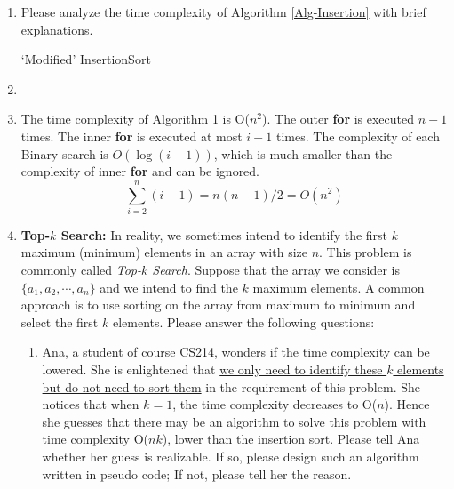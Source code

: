 \documentclass[12pt,a4paper]{article}
\makeatletter
\newtheorem*{solution}{Solution}
\theoremstyle{definition}
\renewenvironment{solution}[1][Solution] {\par\pushQED{\qed}\normalfont\topsep6\p@\@plus6\p@\relax\trivlist\item[\hskip\labelsep\bfseries#1\@addpunct{.}]\ignorespaces}{\popQED\endtrivlist\@endpefalse} \makeatother
\makeatother
\begin{document}
\begin{enumerate}
\begin{enumerate}
\begin{proof}
    So the assumption $p_{k+1}\geq2^{2^{k+1}}$ fails. Thus, $p_{k+1}<2^{2^{k+1}}$. $P(k+1)$ is true.

    Together, $p_n<2^{2^n} (n \in \mathbb{N})$.
    \end{proof}
\end{enumerate}

\item Please analyze the time complexity of Algorithm \ref{Alg-Insertion} with brief explanations.

\begin{minipage}[t]{0.94\textwidth}
\begin{algorithm}[H]
\BlankLine
\caption{`Modified' InsertionSort}
\label{Alg-Insertion}
\end{algorithm}
\end{minipage}\newpage

\begin{solution}
\item The time complexity of Algorithm 1 is O($n^2$).
    The outer \textbf{for} is executed $n-1$ times. The inner \textbf{for} is executed at most $i-1$ times. The complexity of each Binary search is $O(\log (i-1))$, which is much smaller than the complexity of inner \textbf{for} and can be ignored.
    $$\sum\limits_{i=2}^n (i-1)={n(n-1)}/2=O(n^2)$$
    \end{solution}

\item \textbf{Top-$k$ Search:} In reality, we sometimes intend to identify the first $k$ maximum (minimum) elements in an array with size $n$. This problem is commonly called \emph{Top-$k$ Search}. Suppose that the array we consider is $\{a_1, a_2, \cdots, a_n\}$ and we intend to find the $k$ maximum elements. A common approach is to use sorting on the array from maximum to minimum and select the first $k$ elements. Please answer the following questions:
    \begin{enumerate}
    \item \label{Question3a} Ana, a student of course CS214, wonders if the time complexity can be lowered. She is enlightened that \underline{we only need to identify these $k$ elements but do not need to sort them} in the requirement of this problem. She notices that when $k=1$, the time complexity decreases to O($n$). Hence she guesses that there may be an algorithm to solve this problem with time complexity O($nk$), lower than the insertion sort. Please tell Ana whether her guess is realizable. If so, please design such an algorithm written in pseudo code; If not, please tell her the reason.


\end{enumerate}
\end{enumerate}
\end{document}
